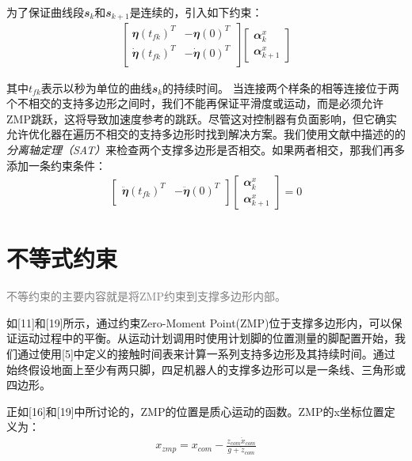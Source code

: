 为了保证曲线段$\mathbfit{s}_k$和$\mathbfit{s}_{k+1}$是连续的，引入如下约束：
\begin{align}
    \begin{bmatrix}
        \mathbfit{\eta}(t_{fk})^T & -\mathbfit{\eta}(0)^T\\
        \mathbfit{\dot \eta}(t_{fk})^T & -\mathbfit{\dot \eta}(0)^T\\
    \end{bmatrix} 
    \begin{bmatrix}
        \mathbfit{\alpha}_k^x\\
        \mathbfit{\alpha}_{k+1}^x
    \end{bmatrix}
\end{align}

其中$t_{fk}$表示以秒为单位的曲线$\mathbfit{s}_k$的持续时间。
当连接两个样条的相等连接位于两个不相交的支持多边形之间时，我们不能再保证平滑度或运动，而是必须允许ZMP跳跃，这将导致加速度参考的跳跃。尽管这对控制器有负面影响，但它确实允许优化器在遍历不相交的支持多边形时找到解决方案。我们使用文献\cite{}中描述的的\emph{分离轴定理（SAT）}来检查两个支撑多边形是否相交。如果两者相交，那我们再多添加一条约束条件：
\begin{align}
    \begin{bmatrix}
        \mathbfit{\ddot \eta}(t_{fk})^T & -\mathbfit{\ddot \eta}(0)^T\\
    \end{bmatrix} 
    \begin{bmatrix}
        \mathbfit{\alpha}_k^x\\
        \mathbfit{\alpha}_{k+1}^x
    \end{bmatrix}=0
\end{align}




\section{不等式约束}

\textcolor{gray}{不等约束的主要内容就是将ZMP约束到支撑多边形内部。}

如[11]和[19]所示，通过约束Zero-Moment Point(ZMP)位于支撑多边形内，可以保证运动过程中的平衡。从运动计划调用时使用计划脚的位置测量的脚配置开始，我们通过使用[5]中定义的接触时间表来计算一系列支持多边形及其持续时间。通过始终假设地面上至少有两只脚，四足机器人的支撑多边形可以是一条线、三角形或四边形。

正如[16]和[19]中所讨论的，ZMP的位置是质心运动的函数。ZMP的x坐标位置定义为：
\begin{align}
    \label{function:zmp}
    x_{zmp}=x_{com}-\frac{z_{com}\ddot x_{com}}{g+\ddot z_{com}}
\end{align}

